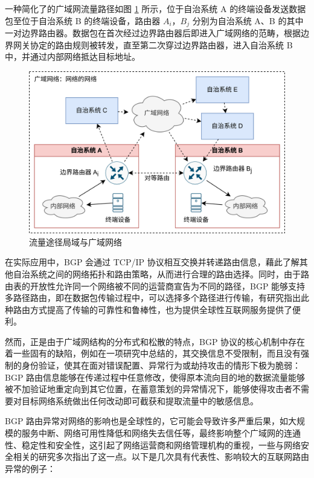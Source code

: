 一种简化了的广域网流量路径如图 \ref{c1_wan-flow} 所示，位于自治系统 A 的终端设备发送数据包至位于自治系统 B 的终端设备，路由器 $A_i$，$B_j$ 分别为自治系统 A、B 的其中一对边界路由器。数据包在首次经过边界路由器后即进入广域网络的范畴，根据边界网关协定的路由规则被转发，直至第二次穿过边界路由器，进入自治系统 B 中，并通过内部网络抵达目标地址。

\begin{figure}[h]
    \includegraphics[width=0.7\linewidth]{chapter/c1_images/c1_wan-flow.png}
    \caption{流量途径局域与广域网络}
    \label{c1_wan-flow}
\end{figure}

在实际应用中，BGP 会通过 TCP/IP 协议相互交换并转递路由信息，藉此了解其他自治系统之间的网络拓扑和路由策略，从而进行合理的路由选择。同时，由于路由表的开放性允许同一个网络被不同的运营商宣告为不同的路径，BGP 能够支持多路径路由，即在数据包传输过程中，可以选择多个路径进行传输，有研究指出此种路由方式提高了传输的可靠性和鲁棒性，也为提供全球性互联网服务提供了便利。 

然而，正是由于广域网结构的分布式和松散的特点，BGP 协议的核心机制中存在着一些固有的缺陷，例如在一项研究中总结的，其交换信息不受限制，而且没有强制的身份验证，使其在面对错误配置、异常行为或劫持攻击的情形下极为脆弱：BGP 路由信息能够在传递过程中任意修改，使得原本流向目的地的数据流量能够被不加验证地重定向到其它位置，在蓄意策划的异常情况下，能够使得攻击者不需要对目标网络系统做出任何改动即可截获和提取流量中的敏感信息。

BGP 路由异常对网络的影响也是全球性的，它可能会导致许多严重后果，如大规模的服务中断、网络可用性降低和网络失去信任等，最终影响整个广域网的连通性、稳定性和安全性，这引起了网络运营商和网络管理机构的重视，一些与网络安全相关的研究多次指出了这一点。以下是几次具有代表性、影响较大的互联网路由异常的例子：

